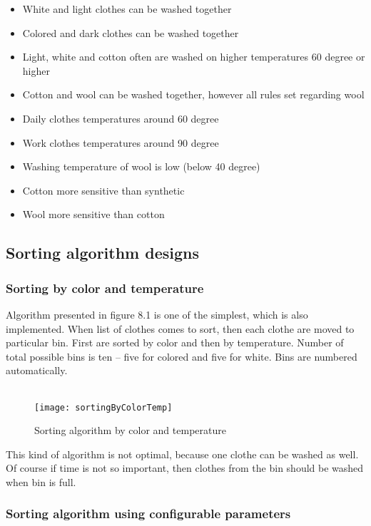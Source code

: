 \begin{itemize}
	\item White and light clothes can be washed together
	\item Colored and dark clothes can be washed together
	\item Light, white and cotton often are washed on higher temperatures 60 degree or higher
	\item Cotton and wool can be washed together, however all rules set regarding wool
	\item Daily clothes temperatures around 60 degree
	\item Work clothes temperatures around 90 degree
	\item Washing temperature of wool is low (below 40 degree)
	\item Cotton more sensitive than synthetic
	\item Wool more sensitive than cotton
\end{itemize}

\subsection{Sorting algorithm designs}

\subsubsection{Sorting by color and temperature}

Algorithm presented in figure 8.1 is one of the simplest, which is also implemented. When list of clothes comes to sort, then each clothe are moved to particular bin. First are sorted by color and then by temperature. Number of total possible bins is ten – five for colored and five for white. Bins are numbered automatically. \\ \\

\begin{figure}[h]
	\centering
		\texttt{[image: sortingByColorTemp]}
	\caption{Sorting algorithm by color and temperature}
	\label{fig:planning}
\end{figure}

This kind of algorithm is not optimal, because one clothe can be washed as well. Of course if time is not so important, then clothes from the bin should be washed when bin is full.

\subsubsection{Sorting algorithm using configurable parameters}

